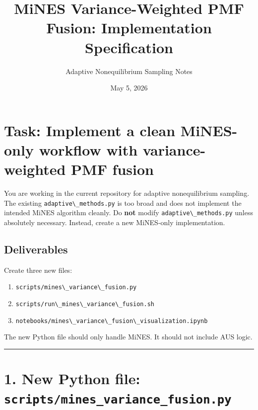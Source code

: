 \documentclass[
  10.5pt,
]{article}
\title{MiNES Variance-Weighted PMF Fusion: Implementation Specification}
\author{Adaptive Nonequilibrium Sampling Notes}
\date{May 5, 2026}
\newcommand{\passthrough}[1]{#1}
\providecommand{\tightlist}{%
  \setlength{\itemsep}{0pt}\setlength{\parskip}{0pt}}
\begin{document}
\maketitle

{
\hypersetup{linkcolor=}
\setcounter{tocdepth}{3}
\tableofcontents
}
\section{Task: Implement a clean MiNES-only workflow with
variance-weighted PMF
fusion}\label{task-implement-a-clean-mines-only-workflow-with-variance-weighted-pmf-fusion}

You are working in the current repository for adaptive nonequilibrium
sampling. The existing \passthrough{\lstinline!adaptive\_methods.py!} is
too broad and does not implement the intended MiNES algorithm cleanly.
Do \textbf{not} modify \passthrough{\lstinline!adaptive\_methods.py!}
unless absolutely necessary. Instead, create a new MiNES-only
implementation.

\subsection{Deliverables}\label{deliverables}

Create three new files:

\begin{enumerate}
\def\labelenumi{\arabic{enumi}.}
\tightlist
\item
  \passthrough{\lstinline!scripts/mines\_variance\_fusion.py!}
\item
  \passthrough{\lstinline!scripts/run\_mines\_variance\_fusion.sh!}
\item
  \passthrough{\lstinline!notebooks/mines\_variance\_fusion\_visualization.ipynb!}
\end{enumerate}

The new Python file should only handle MiNES. It should not include AUS
logic.

\begin{center}\rule{0.5\linewidth}{0.5pt}\end{center}

\section{\texorpdfstring{1. New Python file:
\texttt{scripts/mines\_variance\_fusion.py}}{1. New Python file: scripts/mines\_variance\_fusion.py}}\label{new-python-file-scriptsmines_variance_fusion.py}
\end{document}

